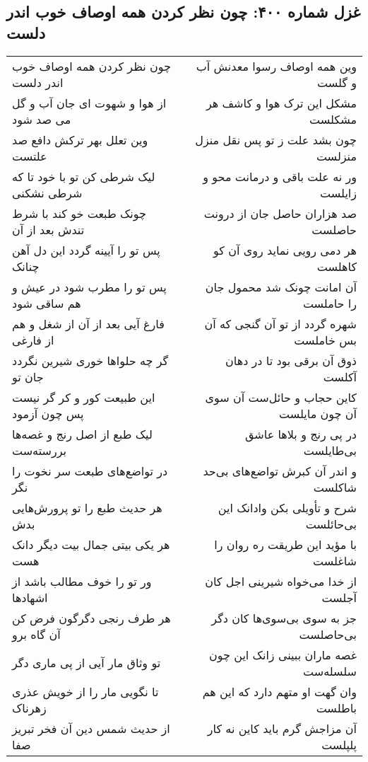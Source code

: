 \begin{center}
\section*{غزل شماره ۴۰۰: چون نظر کردن همه اوصاف خوب اندر دلست}
\label{sec:0400}
\begin{longtable}{l p{0.5cm} r}
چون نظر کردن همه اوصاف خوب اندر دلست
&&
وین همه اوصاف رسوا معدنش آب و گلست
\\
از هوا و شهوت ای جان آب و گل می صد شود
&&
مشکل این ترک هوا و کاشف هر مشکلست
\\
وین تعلل بهر ترکش دافع صد علتست
&&
چون بشد علت ز تو پس نقل منزل منزلست
\\
لیک شرطی کن تو با خود تا که شرطی نشکنی
&&
ور نه علت باقی و درمانت محو و زایلست
\\
چونک طبعت خو کند با شرط تندش بعد از آن
&&
صد هزاران حاصل جان از درونت حاصلست
\\
پس تو را آیینه گردد این دل آهن چنانک
&&
هر دمی رویی نماید روی آن کو کاهلست
\\
پس تو را مطرب شود در عیش و هم ساقی شود
&&
آن امانت چونک شد محمول جان را حاملست
\\
فارغ آیی بعد از آن از شغل و هم از فارغی
&&
شهره گردد از تو آن گنجی که آن بس خاملست
\\
گر چه حلواها خوری شیرین نگردد جان تو
&&
ذوق آن برقی بود تا در دهان آکلست
\\
این طبیعت کور و کر گر نیست پس چون آزمود
&&
کاین حجاب و حائل‌ست آن سوی آن چون مایلست
\\
لیک طبع از اصل رنج و غصه‌ها بررسته‌ست
&&
در پی رنج و بلاها عاشق بی‌طایلست
\\
در تواضع‌های طبعت سر نخوت را نگر
&&
و اندر آن کبرش تواضع‌های بی‌حد شاکلست
\\
هر حدیث طبع را تو پرورش‌هایی بدش
&&
شرح و تأویلی بکن وادانک این بی‌حائلست
\\
هر یکی بیتی جمال بیت دیگر دانک هست
&&
با مؤید این طریقت ره روان را شاغلست
\\
ور تو را خوف مطالب باشد از اشهادها
&&
از خدا می‌خواه شیرینی اجل کان آجلست
\\
هر طرف رنجی دگرگون فرض کن آن گاه برو
&&
جز به سوی بی‌سوی‌ها کان دگر بی‌حاصلست
\\
تو وثاق مار آیی از پی ماری دگر
&&
غصه ماران ببینی زانک این چون سلسله‌ست
\\
تا نگویی مار را از خویش عذری زهرناک
&&
وان گهت او متهم دارد که این هم باطلست
\\
از حدیث شمس دین آن فخر تبریز صفا
&&
آن مزاجش گرم باید کاین نه کار پلپلست
\\
\end{longtable}
\end{center}
